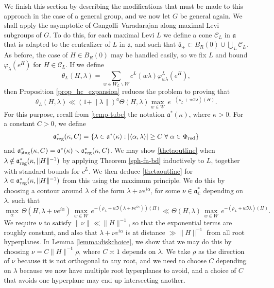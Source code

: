 \documentclass[12pt]{amsart}
\theoremstyle{remark}
\newcommand{\C}{\mathbb C}
\newcommand{\ga}{\mathfrak a}
\newcommand{\be}{\begin{equation}}
\newcommand{\ee}{\end{equation}}
\begin{document}
We finish this section by describing the modifications that must be made to this approach in the case of a general group, and we now let $G$ be general again.  We shall apply the asymptotic of Gangolli--Varadarajan along maximal Levi subgroups of $G$.  To do this, for each maximal Levi $L$ we define a cone $\mathcal{C}_L$ in $\ga$ that is adapted to the centralizer of $L$ in $\ga$, and such that $\overline{\ga}_+ \subset B_R(0) \cup \bigcup_L \mathcal{C}_L$.  As before, the case of $H \in B_R(0)$ may be handled easily, so we fix $L$ and bound $\varphi_\lambda(e^H)$ for $H \in \mathcal{C}_L$.  If we define
\[
\theta_L(H, \lambda) = \sum_{w \in W_L \backslash W} c^L(w \lambda) \varphi^L_{w \lambda}(e^H),
\]
then Proposition \ref{prop_hc_expansion} reduces the problem to proving that
\be
\label{thetaoutline}
\theta_L(H, \lambda) \ll (1 + \| \lambda \|)^a \Theta(H, \lambda) \underset{w \in W}{\max} \, e^{-(\rho_L + w \Im \lambda)(H)}.
\ee
For this purpose, recall from \eqref{temp-tube} the notation $\mathfrak{a}^*(\kappa)$, where $\kappa>0$. For a constant $C>0$, we define
\begin{equation}\label{defn:a-reg-kappa}
\mathfrak{a}_{\rm reg}^* (\kappa,C) =\{\lambda\in\mathfrak{a}^*(\kappa): |\langle\alpha ,\lambda \rangle|\ge C\;\forall\;\alpha \in \Phi_{\textnormal{red}} \}
\end{equation}
and $\mathfrak{a}_{\rm sing}^* (\kappa,C) = \mathfrak{a}^* (\kappa) \smallsetminus \mathfrak{a}_{\rm reg}^* (\kappa,C)$. We may show \eqref{thetaoutline} when $\lambda \notin \mathfrak{a}_{\rm reg}^* (\kappa, \| H \|^{-1})$ by applying Theorem \ref{sph-fn-bd} inductively to $L$, together with standard bounds for $c^L$.  We then deduce \eqref{thetaoutline} for $\lambda \in \mathfrak{a}_{\rm reg}^* (\kappa, \| H \|^{-1})$ from this using the maximum principle.  We do this by choosing a contour around $\lambda$ of the form $\lambda + \nu e^{i\alpha}$, for some $\nu \in \ga^*_\C$ depending on $\lambda$, such that
\[
\underset{\alpha}{\max} \, \Theta(H, \lambda + \nu e^{i\alpha}) \, \underset{w \in W}{\max} \, e^{-(\rho_L + w \Im (\lambda + \nu e^{i\alpha}))(H)} \ll \Theta(H, \lambda) \, \underset{w \in W}{\max} \, e^{-(\rho_L + w \Im \lambda)(H)}.
\]
We require $\nu$ to satisfy $\| \nu \| \ll \| H \|^{-1}$, so that the exponential terms are roughly constant, and also that $\lambda + \nu e^{i\alpha}$ is at distance $\gg \| H \|^{-1}$ from all root hyperplanes.  In Lemma \ref{lemma:diskchoice}, we show that we may do this by choosing $\nu = C \| H \|^{-1} \rho$, where $C \asymp 1$ depends on $\lambda$.  We take $\rho$ as the direction of $\nu$ because it is not orthogonal to any root, and we need to choose $C$ depending on $\lambda$ because we now have multiple root hyperplanes to avoid, and a choice of $C$ that avoids one hyperplane may end up intersecting another.
\end{document}
